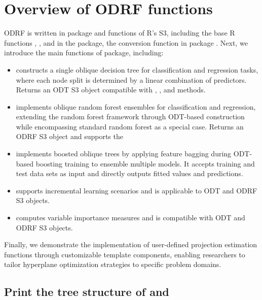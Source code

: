 
\section{Overview of ODRF functions} \label{sec:functions}

ODRF is written in  \citep{Rcpp} package and functions of R's S3, including the base R functions , , and  in the  package, the conversion function  in package  \citep{2015Partykit}.  Next, we introduce the main functions of  package, including: %
{
\begin{itemize} 
\item {} constructs a single oblique decision tree for classification and regression tasks, where each node split is determined by a linear combination of predictors. Returns an ODT S3 object compatible with , , and  methods. 
\item {} implements oblique random forest ensembles for classification and regression, extending the random forest framework through ODT-based construction while encompassing standard random forest as a special case. Returns an ODRF S3 object and supports the
\item {} implements boosted oblique trees by applying feature bagging during ODT-based boosting training to ensemble multiple models. It accepts training and test data sets as input and directly outputs fitted values and predictions. 
\item {} supports incremental learning scenarios and is applicable to ODT and ODRF S3 objects. 
\item {} computes variable importance measures and is compatible with ODT and ODRF S3 objects. \end{itemize}
}
Finally, we demonstrate the implementation of user-defined projection estimation functions through customizable template components, enabling researchers to tailor hyperplane optimization strategies to specific problem domains.

\subsection[Print the tree structure of ODT and  ODRF]{Print the tree structure of  and  }

